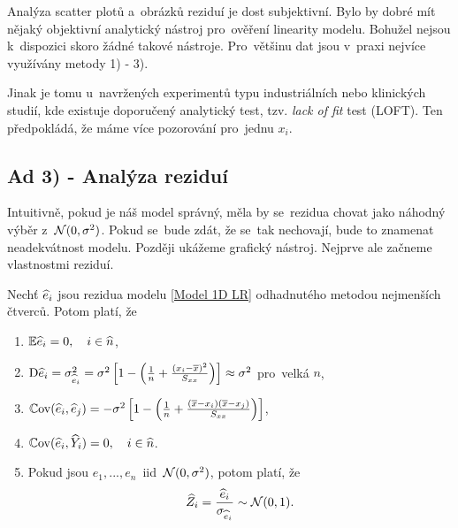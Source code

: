\begin{example}
\begin{enumerate}[1)]
	
\end{enumerate}	
	
\end{example}
\begin{example}
	Analýza scatter plotů a~obrázků reziduí je dost subjektivní. Bylo by dobré mít nějaký objektivní analytický nástroj pro~ověření linearity modelu. Bohužel nejsou k~dispozici skoro žádné takové nástroje. Pro~většinu dat jsou v~praxi nejvíce využívány metody 1) - 3).
	
	Jinak je tomu u~navržených experimentů typu industriálních nebo klinických studií, kde existuje doporučený analytický test, tzv. \textit{lack of fit} test (LOFT). Ten předpokládá, že máme více pozorování pro~jednu $x_i$.
\end{example}

\subsection*{Ad 3) - Analýza reziduí}
Intuitivně, pokud je náš model správný, měla by se~rezidua chovat jako náhodný výběr z~$\mathcal{N}(0,\sigma^2)$. Pokud se~bude zdát, že se~tak nechovají, bude to znamenat neadekvátnost modelu. Později ukážeme grafický nástroj. Nejprve ale začneme vlastnostmi reziduí.

\begin{theorem}
	Nechť $\widehat{e}_i$ jsou rezidua modelu \eqref{Model 1D LR} odhadnutého metodou nejmenších čtverců. Potom platí, že
	\begin{enumerate}
		\item $\mathbb{E} \widehat{e}_i = 0, \quad i\in\widehat{n} $,
		\item $\mathrm{D} \widehat{e}_i = \sigma_{\widehat{e}_i}^2 = \sigma^2 \left[1 - \left(\frac{1}{n} + \frac{(x_i - \overline{x})^2}{S_{xx}} \right) \right] \approx \sigma^2$ pro~velká $n$,
		\item $\mathbb{C}\mathrm{ov} (\widehat{e}_i, \widehat{e}_j) = -\sigma^2 \left[1 - \left(\frac{1}{n} + \frac{(\overline{x} - x_i)(\overline{x} - x_j)}{S_{xx}} \right) \right]$,
		\item $\mathbb{C}\mathrm{ov}(\widehat{e}_i, \widehat{Y}_i) = 0, \quad i\in\widehat{n} $.
		\item Pokud jsou $e_1,..., e_n$~iid~$\mathcal{N}(0,\sigma^2)$, potom platí, že
		 $$
			\widehat{Z}_i = \frac{\widehat{e}_i}{\sigma_{\widehat{e}_i}} \sim \mathcal{N} (0,1).
		 $$
	\end{enumerate}
\end{theorem}

